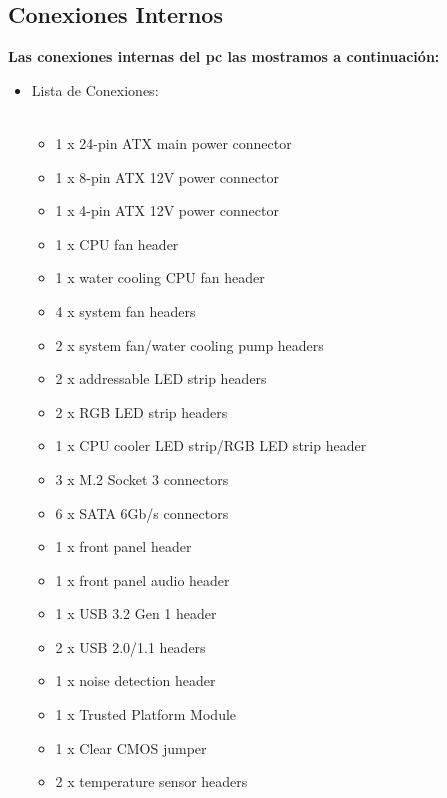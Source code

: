 \documentclass{article}
\begin{document}
    \subsection{Conexiones Internos}
    \normalsize
      {\bfseries Las conexiones internas del pc las mostramos a continuación: }%
      \begin{itemize}
        \item Lista de Conexiones:\\
        \\
        \begin{minipage}{0.5\textwidth}
          \begin{itemize}%
            \item 1 x 24-pin ATX main power connector
            \item 1 x 8-pin ATX 12V power connector
            \item 1 x 4-pin ATX 12V power connector
            \item 1 x CPU fan header
            \item 1 x water cooling CPU fan header
            \item 4 x system fan headers
            \item 2 x system fan/water cooling pump headers
            \item 2 x addressable LED strip headers
            \item 2 x RGB LED strip headers
            \item 1 x CPU cooler LED strip/RGB LED strip header
            \item 3 x M.2 Socket 3 connectors
            \item 6 x SATA 6Gb/s connectors
            \item 1 x front panel header
            \item 1 x front panel audio header
            \item 1 x USB 3.2 Gen 1 header
            \item 2 x USB 2.0/1.1 headers
            \item 1 x noise detection header
            \item 1 x Trusted Platform Module
            \item 1 x Clear CMOS jumper
            \item 2 x temperature sensor headers
          \end{itemize}
        \end{minipage}

\end{itemize}
\end{document}
